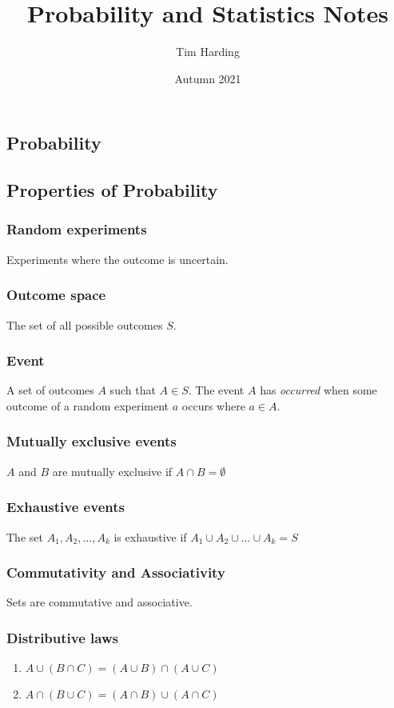 \documentclass{article}
\title{Probability and Statistics Notes}
\author{Tim Harding}
\date{Autumn 2021}
\begin{document}
\begin{multicols*}{2}

\section{Probability}

\subsection{Properties of Probability}

\subsubsection{Random experiments}
Experiments where the outcome is uncertain.

\subsubsection{Outcome space}
The set of all possible outcomes $S$.

\subsubsection{Event}
A set of outcomes $A$ such that $A \in S$. The event $A$ has \textit{occurred} when some outcome of a random experiment $a$ occurs where $a \in A$.

\subsubsection{Mutually exclusive events}
$A$ and $B$ are mutually exclusive if $A \cap B = \emptyset$

\subsubsection{Exhaustive events}
The set $A_1, A_2, \ldots, A_k$ is exhaustive if $A_1 \cup A_2 \cup \ldots \cup A_k = S$

\subsubsection{Commutativity and Associativity}
Sets are commutative and associative.

\subsubsection{Distributive laws}
\begin{enumerate}
    \item $A \cup (B \cap C) = (A \cup B) \cap (A \cup C)$
    \item $A \cap (B \cup C) = (A \cap B) \cup (A \cap C)$
\end{enumerate}


\end{multicols*}
\end{document}
